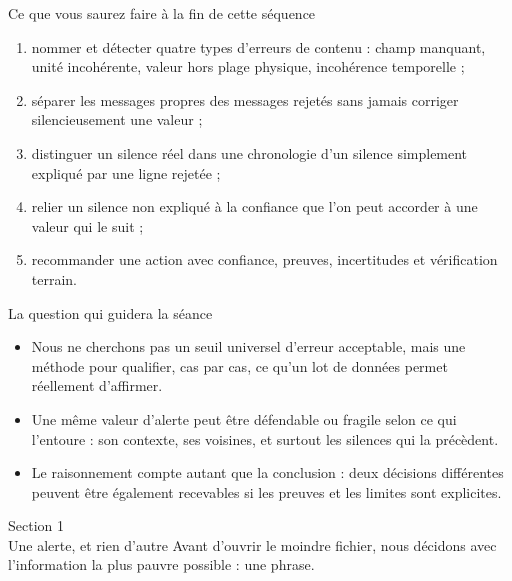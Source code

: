 \documentclass[aspectratio=169]{beamer}
\begin{document}
\begin{frame}{Ce que vous saurez faire à la fin de cette séquence}
  \begin{enumerate}
    \item nommer et détecter quatre types d'erreurs de contenu : champ manquant, unité incohérente, valeur hors plage physique, incohérence temporelle ;
    \item séparer les messages propres des messages rejetés sans jamais corriger silencieusement une valeur ;
    \item distinguer un silence réel dans une chronologie d'un silence simplement expliqué par une ligne rejetée ;
    \item relier un silence non expliqué à la confiance que l'on peut accorder à une valeur qui le suit ;
    \item recommander une action avec confiance, preuves, incertitudes et vérification terrain.
  \end{enumerate}
\end{frame}

\begin{frame}{La question qui guidera la séance}
  \begin{itemize}
    \item Nous ne cherchons pas un seuil universel d'erreur acceptable, mais une méthode pour qualifier, cas par cas, ce qu'un lot de données permet réellement d'affirmer.
    \item Une même valeur d'alerte peut être défendable ou fragile selon ce qui l'entoure : son contexte, ses voisines, et surtout les silences qui la précèdent.
    \item Le raisonnement compte autant que la conclusion : deux décisions différentes peuvent être également recevables si les preuves et les limites sont explicites.
  \end{itemize}
\end{frame}

\begin{frame}[plain]
  \centering
  \Huge Section 1\\[3mm]
  \Large Une alerte, et rien d'autre
  \vfill
  \normalsize Avant d'ouvrir le moindre fichier, nous décidons avec l'information la plus pauvre possible : une phrase.
\end{frame}
\end{document}

